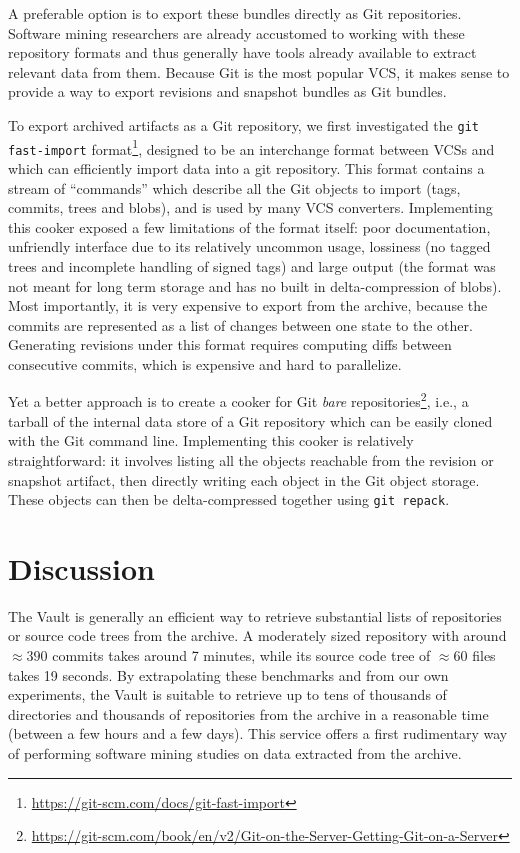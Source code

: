 A preferable option is to export these bundles directly as Git repositories.
Software mining researchers are already accustomed to working with these
repository formats and thus generally have tools already available to extract
relevant data from them. Because Git is the most popular \gls{VCS}, it makes
sense to provide a way to export revisions and snapshot bundles as Git bundles.

To export archived artifacts as a Git repository, we first investigated the
\texttt{git fast-import}
format\footnote{\url{https://git-scm.com/docs/git-fast-import}}, designed to be
an interchange format between \glspl{VCS} and which can efficiently import data
into a git repository. This format contains a stream of ``commands'' which
describe all the Git objects to import (tags, commits, trees and blobs), and is
used by many \gls{VCS} converters. Implementing this cooker exposed a few
limitations of the format itself: poor documentation, unfriendly interface due
to its relatively uncommon usage, lossiness (no tagged trees and incomplete
handling of signed tags) and large output (the format was not meant for long
term storage and has no built in delta-compression of blobs).  Most
importantly, it is very expensive to export from the archive, because the
commits are represented as a list of changes between one state to the other.
Generating revisions under this format requires computing diffs between
consecutive commits, which is expensive and hard to parallelize.

Yet a better approach is to create a cooker for Git \emph{bare}
repositories\footnote{\url{https://git-scm.com/book/en/v2/Git-on-the-Server-Getting-Git-on-a-Server}},
i.e., a tarball of the internal data store of a Git repository which can be
easily cloned with the Git command line. Implementing this cooker is relatively
straightforward: it involves listing all the objects reachable from the
revision or snapshot artifact, then directly writing each object in the Git
object storage. These objects can then be delta-compressed together using
\texttt{git repack}.

\section{Discussion}

The Vault is generally an efficient way to retrieve substantial lists of
repositories or source code trees from the archive. A moderately sized
repository with around $\approx390$ commits takes around 7 minutes, while its
source code tree of $\approx60$ files takes 19 seconds. By extrapolating these
benchmarks and from our own experiments, the Vault is suitable to retrieve up
to tens of thousands of directories and thousands of repositories from the
archive in a reasonable time (between a few hours and a few days). This service
offers a first rudimentary way of performing software mining studies on data
extracted from the archive.

